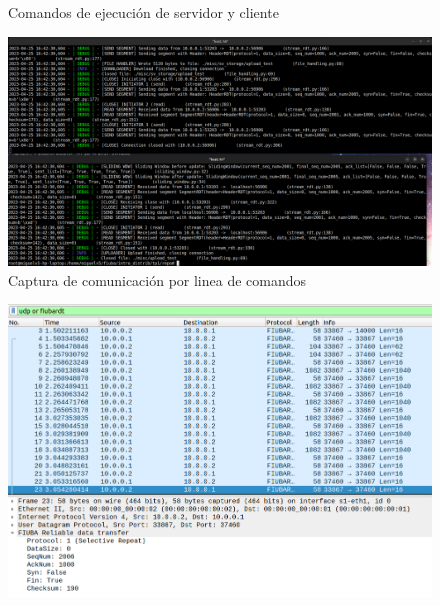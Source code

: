 \documentclass[11pt,a4paper]{article}
\begin{document}
\begin{itemize}
\begin{itemize}
\begin{figure}[H]
\begin{center}
                            \end{center}
                            \caption{Comandos de ejecuci\'{o}n de servidor y cliente}
                        \end{figure}
                        \begin{figure}[H]
                            \begin{center}
                            \includegraphics[width=18cm]{images/tests/t1/upload/T1_3.2_upload_SR_loss10.png}
                            \end{center}
                            \caption{Captura de comunicaci\'{o}n por linea de comandos}
                        \end{figure}
                        \begin{figure}[H]
                            \begin{center}
                            \includegraphics[width=15cm]{images/tests/t1/upload/T1_3.3_upload_SR_loss10.png}

\end{center}
\end{figure}
\end{itemize}
\end{itemize}
\end{document}
